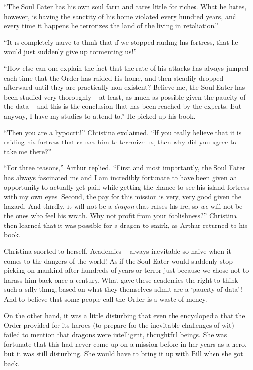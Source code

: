 \documentclass[showtrims,b6paper,draft,10pt]{memoir}
\begin{document}
``The Soul Eater has his own soul farm and cares little for riches.  What he hates, however, is having the sanctity of his home violated every hundred years, and every time it happens he terrorizes the land of the living in retaliation.''

``It is completely naive to think that if we stopped raiding his fortress, that he would just suddenly give up tormenting us!''

``How else can one explain the fact that the rate of his attacks has always jumped each time that the Order has raided his home, and then steadily dropped afterward until they are practically non-existent?  Believe me, the Soul Eater has been studied very thoroughly -- at least, as much as possible given the paucity of the data -- and this is the conclusion that has been reached by the experts.  But anyway, I have my studies to attend to.''  He picked up his book.

``Then you are a hypocrit!'' Christina exclaimed.  ``If you really believe that it is raiding his fortress that causes him to terrorize us, then why did you agree to take me there?''

``For three reasons,'' Arthur replied.  ``First and most importantly, the Soul Eater has always fascinated me and I am incredibly fortunate to have been given an opportunity to actually get paid while getting the chance to see his island fortress with my own eyes!  Second, the pay for this mission is very, very good given the hazard.  And thirdly, it will not be a \emph{dragon} that raises his ire, so \emph{we} will not be the ones who feel his wrath.  Why not profit from your foolishness?''  Christina then learned that it was possible for a dragon to smirk, as Arthur returned to his book.

Christina snorted to herself.  Academics -- always inevitable so naive when it comes to the dangers of the world!  As if the Soul Eater would suddenly stop picking on mankind after hundreds of years or terror just because we chose not to harass him back once a century.  What gave these academics the right to think such a silly thing, based on what they themselves admit are a `paucity of data'!  And to believe that some people call the Order is a waste of money.

On the other hand, it was a little disturbing that even the encyclopedia that the Order provided for its heroes (to prepare for the inevitable challenges of wit) failed to mention that dragons were intelligent, thoughtful beings.  She was fortunate that this had never come up on a mission before in her years as a hero, but it was still disturbing.  She would have to bring it up with Bill when she got back.
\end{document}

